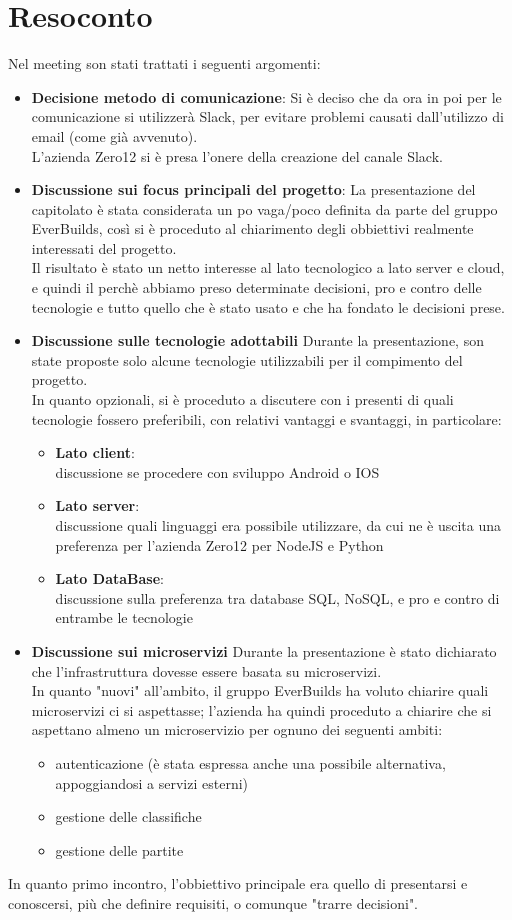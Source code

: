 \newpage
\section{Resoconto}
	Nel meeting son stati trattati i seguenti argomenti:
	\begin{itemize}
		\item\textbf{Decisione metodo di comunicazione}:
			Si è deciso che da ora in poi per le comunicazione si utilizzerà Slack, per evitare problemi causati dall'utilizzo di email (come già avvenuto).\\
			L'azienda Zero12 si è presa l'onere della creazione del canale Slack.
		\item\textbf{Discussione sui focus principali del progetto}:
			La presentazione del capitolato è stata considerata un po vaga/poco definita da parte del gruppo EverBuilds, così si è proceduto al chiarimento degli obbiettivi realmente interessati del progetto. \\
			Il risultato è stato un netto interesse al lato tecnologico a lato server e cloud, e quindi il perchè abbiamo preso determinate decisioni, pro e contro delle tecnologie e tutto quello che è stato usato e che ha fondato le decisioni prese.
		\item\textbf{Discussione sulle tecnologie adottabili}
			Durante la presentazione, son state proposte solo alcune tecnologie utilizzabili per il compimento del progetto. \\
			In quanto opzionali, si è proceduto a discutere con i presenti di quali tecnologie fossero preferibili, con relativi vantaggi e svantaggi, in particolare:
			\begin{itemize}
				\item\textbf{Lato client}: \\
					discussione se procedere con sviluppo Android o IOS
				\item\textbf{Lato server}: \\
					discussione quali linguaggi era possibile utilizzare, da cui ne è uscita una preferenza per l'azienda Zero12 per NodeJS e Python
				\item\textbf{Lato DataBase}: \\
					discussione sulla preferenza tra database SQL, NoSQL, e pro e contro di entrambe le tecnologie
			\end{itemize}
		\item\textbf{Discussione sui microservizi}
			Durante la presentazione è stato dichiarato che l'infrastruttura dovesse essere basata su microservizi. \\
			In quanto "nuovi" all'ambito, il gruppo EverBuilds ha voluto chiarire quali microservizi ci si aspettasse; l'azienda ha quindi proceduto a chiarire che si aspettano almeno un microservizio per ognuno dei seguenti ambiti:
			\begin{itemize}
				\item autenticazione (è stata espressa anche una possibile alternativa, appoggiandosi a servizi esterni)
				\item gestione delle classifiche
				\item gestione delle partite 
			\end{itemize}
	\end{itemize}
	In quanto primo incontro, l'obbiettivo principale era quello di presentarsi e conoscersi, più che definire requisiti, o comunque "trarre decisioni".



